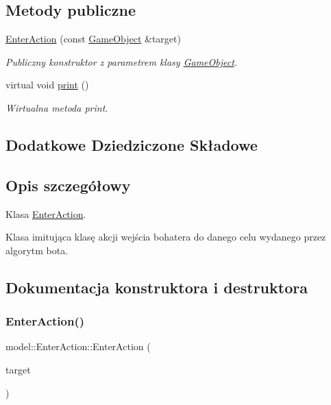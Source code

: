 \subsection*{Metody publiczne}
\begin{DoxyCompactItemize}
\item 
\hyperlink{classmodel_1_1EnterAction_ac95609f75be49871c93e2948229f0049}{Enter\+Action} (const \hyperlink{classmodel_1_1GameObject}{Game\+Object} \&target)
\begin{DoxyCompactList}\small\item\em Publiczny konstruktor z parametrem klasy \hyperlink{classmodel_1_1GameObject}{Game\+Object}. \end{DoxyCompactList}\item 
virtual void \hyperlink{classmodel_1_1EnterAction_a0e6f49b42a1c026c421f29193670abeb}{print} ()
\begin{DoxyCompactList}\small\item\em Wirtualna metoda print. \end{DoxyCompactList}\end{DoxyCompactItemize}
\subsection*{Dodatkowe Dziedziczone Składowe}


\subsection{Opis szczegółowy}
Klasa \hyperlink{classmodel_1_1EnterAction}{Enter\+Action}. 

Klasa imitująca klasę akcji wejścia bohatera do danego celu wydanego przez algorytm bota. 

\subsection{Dokumentacja konstruktora i destruktora}
\mbox{\label{classmodel_1_1EnterAction_ac95609f75be49871c93e2948229f0049}} 
\subsubsection{\texorpdfstring{Enter\+Action()}{EnterAction()}}
{\footnotesize\ttfamily model\+::\+Enter\+Action\+::\+Enter\+Action (\begin{DoxyParamCaption}\item[{const \hyperlink{classmodel_1_1GameObject}{Game\+Object} \&}]{target }\end{DoxyParamCaption})\hspace{0.3cm}{\ttfamily [inline]}}




